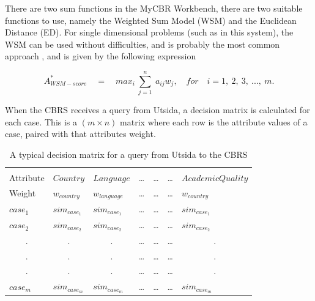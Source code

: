 There are two sum functions in the MyCBR Workbench, there are two suitable functions to use, namely the Weighted Sum Model (WSM) and the Euclidean Distance (ED). For single dimensional problems (such as in this system), the WSM can be used without difficulties, and is probably the most common approach \cite{triantaphyllou2000multi}, and is given by the following expression \cite{fishburn1967letter}

\begin{displaymath}
    A^{*}_{WSM-score}\quad =\quad max_{i}\  \sum\limits_{j = 1}^{n}\  a_{ij}w_{j},\quad for \quad i =1,\ 2,\ 3,\ ...,\ m.
\end{displaymath}

When the CBRS receives a query from Utsida, a decision matrix is calculated for each case. This is a $(m \times n)$ matrix where each row is the attribute values of a case, paired with that attributes weight. 


\begin{table}[h]
\centering
\caption{A typical decision matrix for a query from Utsida to the CBRS}
\label{tab:decision_matrix}
\begin{tabular}{lllcccl}
                      &                       &                       & \multicolumn{1}{l}{} & \multicolumn{1}{l}{} & \multicolumn{1}{l}{} &                       \\
Attribute             & $Country$             & $Language$            & \ldots               & \ldots               & \ldots               & $AcademicQuality$     \\\hline
Weight                & $w_{country}$         & $w_{language}$        & \ldots               & \ldots               & \ldots               & $w_{country}$         \\\hline
$case_{1}$            & $sim_{case_{1}}$      & $sim_{case_{1}}$      & \ldots               & \ldots               & \ldots               & $sim_{case_{1}}$      \\
$case_{2}$            & $sim_{case_{2}}$      & $sim_{case_{2}}$      & \ldots               & \ldots               & \ldots               & $sim_{case_{2}}$      \\
\multicolumn{1}{c}{.} & \multicolumn{1}{c}{.} & \multicolumn{1}{c}{.} & \ldots               & \ldots               & \ldots               & \multicolumn{1}{c}{.} \\
\multicolumn{1}{c}{.} & \multicolumn{1}{c}{.} & \multicolumn{1}{c}{.} & \ldots               & \ldots               & \ldots               & \multicolumn{1}{c}{.} \\
\multicolumn{1}{c}{.} & \multicolumn{1}{c}{.} & \multicolumn{1}{c}{.} & \ldots               & \ldots               & \ldots               & \multicolumn{1}{c}{.} \\
$case_{m}$            & $sim_{case_{m}}$      & $sim_{case_{m}}$      & \ldots               & \ldots               & \ldots               & $sim_{case_{m}}$     
\end{tabular}
\end{table}


